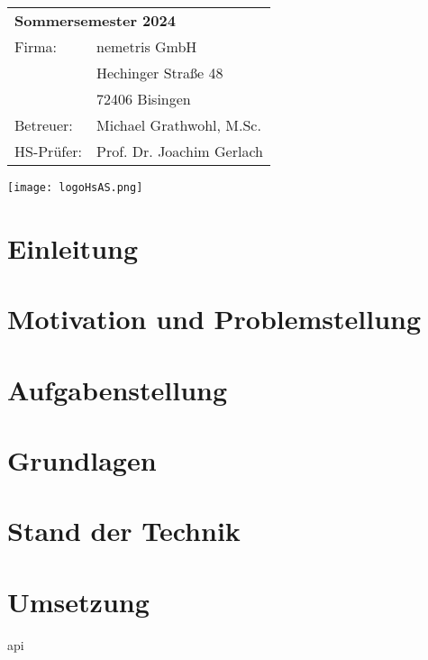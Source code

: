 \documentclass[
	ngerman,
	a4paper,
	twoside
]{scrbook}
\begin{document}
\begin{titlepage}
	\maketitle
	\begin{tabular}{ ll }
		\multicolumn{2}{l}{\textbf{Sommersemester 2024}} \\
		Firma: &  nemetris GmbH\\
	   	& Hechinger Straße 48\\
		& 72406 Bisingen\\
		Betreuer: & Michael Grathwohl, M.Sc.\\
		HS-Prüfer: & Prof. Dr. Joachim Gerlach
	\end{tabular}
	\vspace{0.5cm}
	\begin{flushright}
    	\texttt{[image: logoHsAS.png]}
	\end{flushright}	
\end{titlepage}




	\tableofcontents
	\listoffigures
	\listoftables
	\ifdeutsch
	\else
	\fi
	\printacronyms	

\chapter{Einleitung}
	
	
\chapter{Motivation und Problemstellung}	

	
	
\chapter{Aufgabenstellung}



\chapter{Grundlagen}



\chapter{Stand der Technik}



\chapter{Umsetzung}

\gls{api}












	\printbibliography
\end{document}
